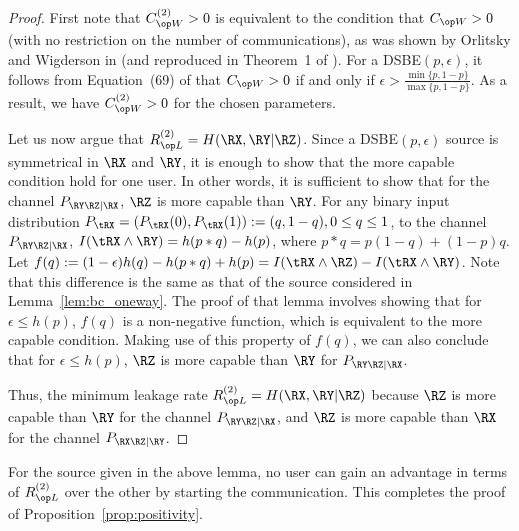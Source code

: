 \begin{proof}
 First note that $\wskc^{(2)}>0$ is equivalent to the condition that $\wskc>0$ (with no restriction on the number of communications), as was shown by Orlitsky and Wigderson in \cite{orlitsky1993secrecy} (and reproduced in Theorem~1 of \cite{amin2020}). For a DSBE$(p,\epsilon)$, it follows from Equation~(69) of \cite{amin2020} that $\wskc>0$ if and only if $\epsilon > \frac{\min\{p,1-p\}}{\max\{p,1-p\}}$. As a result, we have $\wskc^{(2)}>0$ for the chosen parameters.


Let us now argue that $\rl^{(2)}=H(\RX,\RY|\RZ)$. Since a DSBE$(p,\epsilon)$ source is symmetrical in $\RX$ and $\RY$, it is enough to show that the more capable condition hold for one user. In other words, it is sufficient to show that for the channel $P_{\RY\RZ | \RX}$, $\RZ$ is more capable than $\RY$. For any binary input distribution $P_{\tRX}=(P_{\tRX}(0), P_{\tRX}(1)):=(q, 1-q), 0 \leq q \leq 1$, to the channel $P_{\RY \RZ | \RX}$,  $I(\tRX\wedge\RY) =  h(p*q) - h(p) $, where $p*q=p(1-q)+(1-p)q$. Let $f(q):= (1-\epsilon)h(q) - h(p*q) +h(p)= I(\tRX\wedge\RZ) - I(\tRX\wedge\RY)$. Note that this difference is the same as that of the source considered in Lemma~\ref{lem:bc_oneway}. The proof of that lemma involves showing that for $\epsilon \leq h(p)$, $f(q)$ is a non-negative function, %
which is equivalent to the more capable condition. %
Making use of this property of $f(q)$, we can also conclude that  for $\epsilon \leq h(p)$, $\RZ$ is more capable than $\RY$ for $P_{\RY\RZ | \RX}$. 

Thus, the minimum leakage rate $\rl^{(2)}=H(\RX,\RY|\RZ)$ because $\RZ$ is more capable than $\RY$ for the channel $P_{\RY\RZ | \RX}$, and $\RZ$ is more capable than $\RX$ for the channel $P_{\RX\RZ | \RY}$.
\end{proof}

For the source given in the above lemma, no user can gain an advantage in terms of $\rl^{(2)}$ over the other by starting the communication. This completes the proof of Proposition~\ref{prop:positivity}. 

